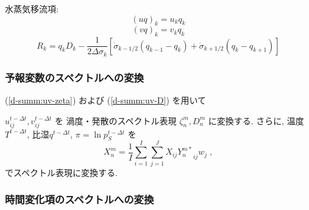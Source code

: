 水蒸気移流項:
\begin{equation}
 (u q)_k  = u_k q_k
\end{equation}
\begin{equation}
 (v q)_k  = v_k q_k
\end{equation}
%
\begin{equation}
R_k  =  q_k D_k 
       - \frac{1}{2 \Delta \sigma_k} 
             [   \dot{\sigma}_{k-1/2} ( q_{k-1} - q_k   )
               + \dot{\sigma}_{k+1/2} ( q_k   - q_{k+1} ) ]
\end{equation}

\subsubsection{予報変数のスペクトルへの変換}

(\ref{d-summ:uv-zeta}) および
(\ref{d-summ:uv-D}) を用いて

$u_{ij}^{t-\Delta t}, v_{ij}^{t-\Delta t}$ を
渦度・発散のスペクトル表現
$\zeta_n^m, D_n^m$ に変換する.
さらに,
温度$T^{t-\Delta t}$, 比湿$q^{t-\Delta t}$, 
$\pi = \ln p_S^{t-\Delta t}$ を
\begin{equation}
  X_n^m  =  \frac{1}{I} \sum_{i=1}^{I} \sum_{j=1}^{J}  
               X_{ij} {Y_n^{m *}}_{ij}  w_j \; ,
\end{equation}
でスペクトル表現に変換する.

\subsubsection{時間変化項のスペクトルへの変換}

